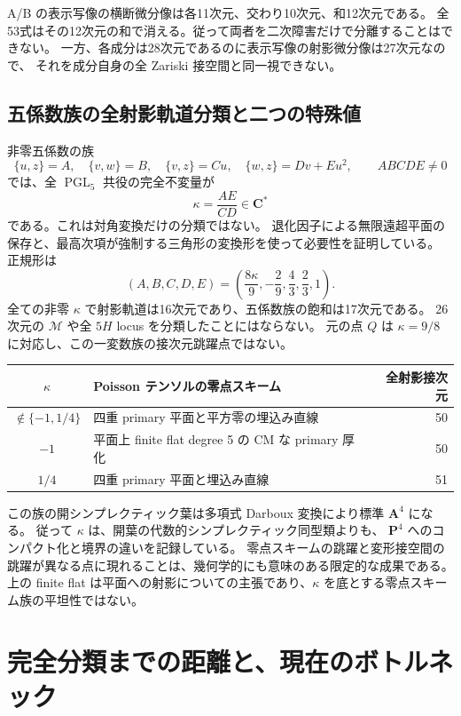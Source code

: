 \documentclass[11pt,a4paper]{ltjsarticle}
\newcommand{\PP}{\mathbf P}\newcommand{\CC}{\mathbf C}\newcommand{\QQ}{\mathbf Q}
\DeclareMathOperator{\PGL}{PGL}\DeclareMathOperator{\GL}{GL}
\theoremstyle{remark}\newtheorem{remark}[proposition]{注意}
\begin{document}
A/B の表示写像の横断微分像は各11次元、交わり10次元、和12次元である。
全53式はその12次元の和で消える。従って両者を二次障害だけで分離することはできない。
一方、各成分は28次元であるのに表示写像の射影微分像は27次元なので、
それを成分自身の全 Zariski 接空間と同一視できない。

\subsection{五係数族の全射影軌道分類と二つの特殊値}

非零五係数の族
\[
 \{u,z\}=A,\quad\{v,w\}=B,\quad
 \{v,z\}=Cu,\quad\{w,z\}=Dv+Eu^2,
 \qquad ABCDE\ne0
\]
では、全 $\PGL_5$ 共役の完全不変量が
\[
 \kappa=\frac{AE}{CD}\in\CC^*
\]
である。これは対角変換だけの分類ではない。
退化因子による無限遠超平面の保存と、最高次項が強制する三角形の変換形を使って必要性を証明している。
正規形は
\[
 (A,B,C,D,E)=\left(\frac{8\kappa}{9},-\frac29,\frac43,\frac23,1\right).
\]
全ての非零 $\kappa$ で射影軌道は16次元であり、五係数族の飽和は17次元である。
26次元の $\mathcal M$ や全 $5H$ locus を分類したことにはならない。
元の点 $Q$ は $\kappa=9/8$ に対応し、この一変数族の接次元跳躍点ではない。

\begin{center}\small
\begin{tabular}{@{}cp{85mm}r@{}}\toprule
$\kappa$ & Poisson テンソルの零点スキーム & 全射影接次元\\\midrule
$\notin\{-1,1/4\}$ & 四重 primary 平面と平方零の埋込み直線 &50\\
$-1$ & 平面上 finite flat degree 5 の CM な primary 厚化 &50\\
$1/4$ & 四重 primary 平面と埋込み直線 &51\\\bottomrule
\end{tabular}
\end{center}

この族の開シンプレクティック葉は多項式 Darboux 変換により標準 $\mathbf A^4$ になる。
従って $\kappa$ は、開葉の代数的シンプレクティック同型類よりも、
$\PP^4$ へのコンパクト化と境界の違いを記録している。
零点スキームの跳躍と変形接空間の跳躍が異なる点に現れることは、幾何学的にも意味のある限定的な成果である。
上の finite flat は平面への射影についての主張であり、$\kappa$ を底とする零点スキーム族の平坦性ではない。

\section{完全分類までの距離と、現在のボトルネック}
\end{document}
